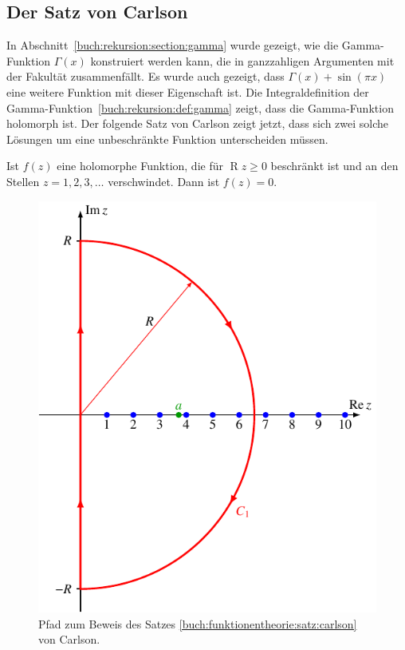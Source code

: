 %
%
%
\subsection{Der Satz von Carlson
\label{buch:funktionentheorie:subsection:satz-von-carlson}}
In Abschnitt~\ref{buch:rekursion:section:gamma} wurde gezeigt,
wie die Gamma-Funktion $\Gamma(x)$ konstruiert werden kann, die
in ganzzahligen Argumenten mit der Fakultät zusammenfällt.
Es wurde auch gezeigt, dass $\Gamma(x)+\sin(\pi x)$ eine
weitere Funktion mit dieser Eigenschaft ist.
Die Integraldefinition der
Gamma-Funktion~\ref{buch:rekursion:def:gamma} zeigt, dass
die Gamma-Funktion holomorph ist.
Der folgende Satz von Carlson zeigt jetzt, dass sich
zwei solche Lösungen um eine unbeschränkte Funktion
unterscheiden müssen.

\begin{satz}[Carlson]
\label{buch:funktionentheorie:satz:carlson}
Ist $f(z)$ eine holomorphe Funktion, die für $\operatorname{R}z\ge 0$
beschränkt ist und an den Stellen $z=1,2,3,\dots$ verschwindet.
Dann ist $f(z)=0$.
\end{satz}

\begin{figure}
\centering
\includegraphics{chapters/080-funktionentheorie/images/carlsonpath.pdf}
\caption{Pfad zum Beweis des Satzes \ref{buch:funktionentheorie:satz:carlson}
von Carlson.
\label{buch:funktionentheorie:fig:carlsonpath}}
\end{figure}

